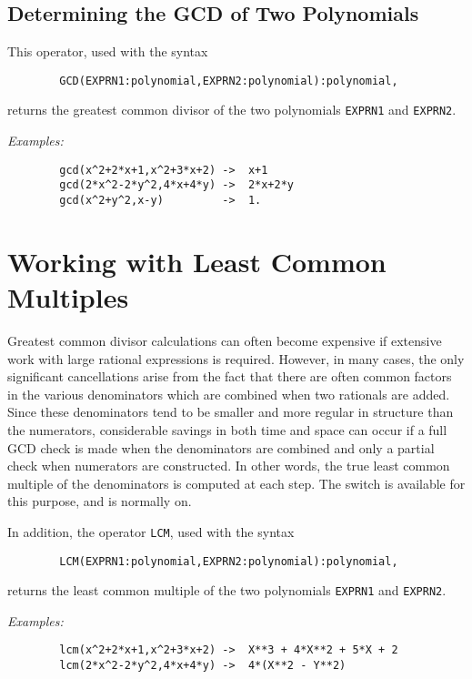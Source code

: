 \subsection{Determining the GCD of Two Polynomials}
\hypertarget{operator:GCD}{}
This operator, used with the syntax
\begin{verbatim}
        GCD(EXPRN1:polynomial,EXPRN2:polynomial):polynomial,
\end{verbatim}
returns the greatest common divisor of the two polynomials \texttt{EXPRN1} and
\texttt{EXPRN2}.

\textit{Examples:}
\begin{verbatim}
        gcd(x^2+2*x+1,x^2+3*x+2) ->  x+1
        gcd(2*x^2-2*y^2,4*x+4*y) ->  2*x+2*y
        gcd(x^2+y^2,x-y)         ->  1.
\end{verbatim}

\section{Working with Least Common Multiples}
\hypertarget{switch:LCM}{}

Greatest common divisor calculations can often become expensive if
extensive work with large rational expressions is required. However, in
many cases, the only significant cancellations arise from the fact that
there are often common factors in the various denominators which are
combined when two rationals are added. Since these denominators tend to be
smaller and more regular in structure than the numerators, considerable
savings in both time and space can occur if a full GCD check is made when
the denominators are combined and only a partial check when numerators are
constructed. In other words, the true least common multiple of the
denominators is computed at each step. The switch 
is available for this purpose, and is normally on.

\hypertarget{operator:LCM}{}
In addition, the operator \texttt{LCM}, used with the syntax
\begin{verbatim}
        LCM(EXPRN1:polynomial,EXPRN2:polynomial):polynomial,
\end{verbatim}
returns the least common multiple of the two polynomials \texttt{EXPRN1} and
\texttt{EXPRN2}.

\textit{Examples:}
\begin{verbatim}
        lcm(x^2+2*x+1,x^2+3*x+2) ->  X**3 + 4*X**2 + 5*X + 2
        lcm(2*x^2-2*y^2,4*x+4*y) ->  4*(X**2 - Y**2)
\end{verbatim}

